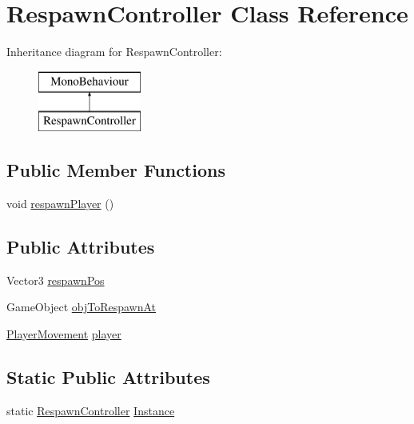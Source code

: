 \hypertarget{class_respawn_controller}{}\section{Respawn\+Controller Class Reference}
\label{class_respawn_controller}
Inheritance diagram for Respawn\+Controller\+:\begin{figure}[H]
\begin{center}
\leavevmode
\includegraphics[height=2.000000cm]{class_respawn_controller}
\end{center}
\end{figure}
\subsection*{Public Member Functions}
\begin{DoxyCompactItemize}
\item 
void \hyperlink{class_respawn_controller_a52ca5ae15d0b818be3db75a6b587207b}{respawn\+Player} ()
\end{DoxyCompactItemize}
\subsection*{Public Attributes}
\begin{DoxyCompactItemize}
\item 
Vector3 \hyperlink{class_respawn_controller_adc58760c896aea8b02aece81e68e1983}{respawn\+Pos}
\item 
Game\+Object \hyperlink{class_respawn_controller_aaf7d1b85658fd2bd4078ccf0806b6d9d}{obj\+To\+Respawn\+At}
\item 
\hyperlink{class_player_movement}{Player\+Movement} \hyperlink{class_respawn_controller_a7f20cfbf2b2f102a367ae8e842b25c4d}{player}
\end{DoxyCompactItemize}
\subsection*{Static Public Attributes}
\begin{DoxyCompactItemize}
\item 
static \hyperlink{class_respawn_controller}{Respawn\+Controller} \hyperlink{class_respawn_controller_a61bb744d1faab394c20a4b1edf8b36c8}{Instance}
\end{DoxyCompactItemize}


